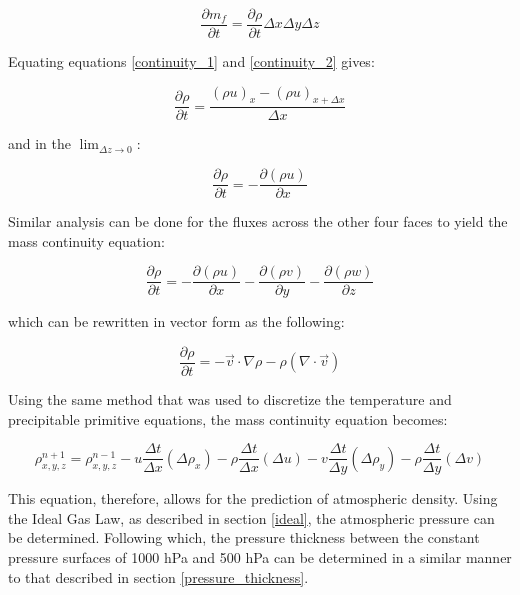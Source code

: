 \begin{equation}
    \label{continuity_2}
    \frac{\partial m_f}{\partial t} = \frac{\partial \rho}{\partial t} \Delta x \Delta y \Delta z
\end{equation}

Equating equations \ref{continuity_1} and \ref{continuity_2} gives:

\begin{equation}
    \frac{\partial \rho}{\partial t} = \frac{(\rho u)_x - (\rho u)_{x + \Delta x}}{\Delta x}
\end{equation}

and in the $\lim_{\Delta z \to 0}$:

\begin{equation}
    \frac{\partial \rho}{\partial t} = - \frac{\partial (\rho u)}{\partial x}
\end{equation}

Similar analysis can be done for the fluxes across the other four faces to yield the mass continuity equation:

\begin{equation}
    \frac{\partial \rho}{\partial t} = - \frac{\partial (\rho u)}{\partial x} - \frac{\partial (\rho v)}{\partial y} - \frac{\partial (\rho w)}{\partial z}
\end{equation}

which can be rewritten in vector form as the following\cite{rho_primitive}:

\begin{equation}
    \frac{\partial \rho}{\partial t} = -\Vec{v} \cdot \nabla \rho - \rho (\nabla \cdot \Vec{v})
\end{equation}

Using the same method that was used to discretize the temperature and precipitable primitive equations, the mass continuity equation becomes:

\begin{equation}
    \rho^{n + 1}_{x, y, z} = \rho^{n - 1}_{x, y, z} - u \frac{\Delta t}{\Delta x} (\Delta \rho_{x}) - \rho \frac{\Delta t}{\Delta x} (\Delta u)
    - v \frac{\Delta t}{\Delta y} (\Delta \rho_{y}) - \rho \frac{\Delta t}{\Delta y} (\Delta v)
\end{equation}

This equation, therefore, allows for the prediction of atmospheric density. Using the Ideal Gas Law, as described in section \ref{ideal}, the atmospheric pressure can be determined. Following which, the pressure thickness between the constant pressure surfaces of 1000 hPa and 500 hPa can be determined in a similar manner to that described in section \ref{pressure_thickness}.
